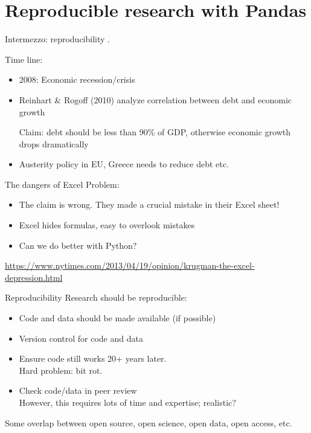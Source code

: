 \documentclass{beamer}
\begin{document}
\section{Reproducible research with Pandas}
\frame{\tableofcontents[currentsection]}

\begin{frame}{Intermezzo: reproducibility}
    .

    Time line:
    \begin{itemize}
        \item 2008: Economic recession/crisis
        \item Reinhart \& Rogoff (2010) analyze correlation between debt and economic growth \\
            \begin{block}{Claim:}
            debt should be less than 90\% of GDP, otherwise economic growth drops dramatically
            \end{block}
        \item Austerity policy in EU, Greece needs to reduce debt etc.
    \end{itemize}
\end{frame}

\begin{frame}{The dangers of Excel}
    Problem:
    \begin{itemize}
        \item The claim is wrong. They made a crucial mistake in their Excel sheet!
        \item Excel hides formulas, easy to overlook mistakes
        \item Can we do better with Python?
    \end{itemize}

    \vspace{1em}
    \url{https://www.nytimes.com/2013/04/19/opinion/krugman-the-excel-depression.html}
\end{frame}

\begin{frame}{Reproducibility}
    Research should be reproducible:

    \begin{itemize}
        \item Code and data should be made available (if possible)
        \item Version control for code and data
        \item Ensure code still works 20+ years later. \\
                Hard problem: bit rot.
        \item Check code/data in peer review \\
            However, this requires lots of time and expertise; realistic?
    \end{itemize}

    Some overlap between open source, open science, open data, open access, etc.
\end{frame}
\end{document}
